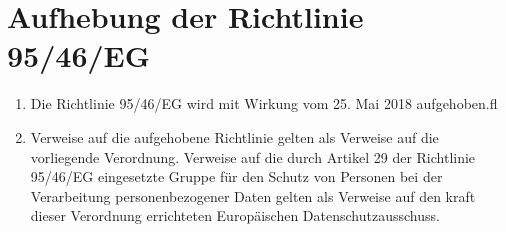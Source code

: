 \chapter{Aufhebung der Richtlinie 95/46/EG}
\label{ch:94}


\begin{enumerate}

  \item Die Richtlinie 95/46/EG wird mit Wirkung vom 25. Mai 2018 aufgehoben.ﬂ
  \label{itm:94-1}

  \item Verweise auf die aufgehobene Richtlinie gelten als Verweise auf die vorliegende Verordnung. Verweise auf die
   durch Artikel 29 der Richtlinie 95/46/EG eingesetzte Gruppe für den Schutz von Personen bei der Verarbeitung
   personenbezogener Daten gelten als Verweise auf den kraft dieser Verordnung errichteten Europäischen
   Datenschutzausschuss.
  \label{itm:94-2}

\end{enumerate}



